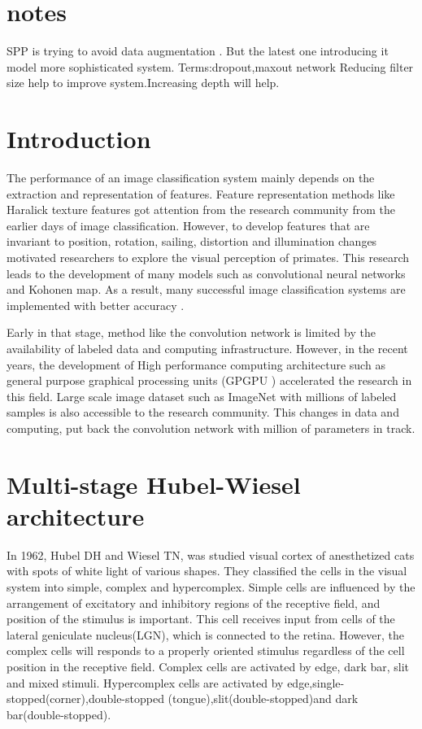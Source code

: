 \documentclass{article}
\begin{document}
\section{notes}
SPP is trying to avoid data augmentation . But the latest one introducing it model more sophisticated system.
Terms:dropout,maxout network
Reducing filter size help to improve system.Increasing depth will help.
\section{Introduction}
The performance of an  image  classification system mainly depends on the  extraction and  representation of features.  Feature representation methods like Haralick texture features \cite{Haralick1973} got attention from the research community from the earlier days of  image classification. However, to develop features that are invariant to position, rotation, sailing, distortion and  illumination changes motivated researchers to  explore the visual perception of primates. This research  leads to  the development of many models such as convolutional neural networks\cite{LeCun1998} and  Kohonen map\cite{kohonen1982self}. 
As a result, many successful image classification systems are  implemented with better accuracy \cite{lecun-89e}.

Early in that stage, method like the convolution network is limited by the  availability of labeled  data and computing infrastructure.  However, in the recent years, the development of  High performance computing architecture such as general purpose graphical processing units (GPGPU )  accelerated the research in this field. Large scale image  dataset such as ImageNet\cite{imagenet}  with  millions of labeled samples is also accessible to the research community. This changes in data and computing, put back the convolution network with million of parameters in track. 

 
\section{Multi-stage Hubel-Wiesel architecture}
In 1962, Hubel DH and Wiesel TN\cite{Hubel1962},\cite{Hubel1965a} was studied visual cortex of anesthetized cats  with   spots of white light of various shapes. They classified the  cells in the visual system into  simple, complex and hypercomplex. Simple cells are influenced  by the arrangement of  excitatory and inhibitory regions of the receptive field, and  position of the stimulus is important. This cell receives input from cells of the lateral geniculate nucleus(LGN), which is connected to the retina. However, the complex cells will responds to  a properly  oriented stimulus regardless of the cell position in the receptive field. Complex cells are activated by edge, dark bar, slit and mixed stimuli. Hypercomplex cells are activated by edge,single-stopped(corner),double-stopped (tongue),slit(double-stopped)and dark bar(double-stopped).
\end{document}
